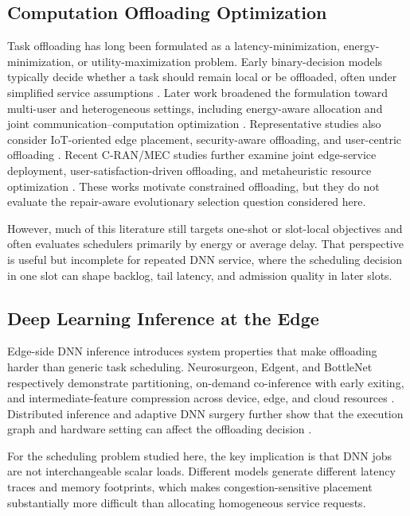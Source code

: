 \documentclass[pdflatex,sn-mathphys-num]{sn-jnl}
\begin{document}
\subsection{Computation Offloading Optimization}
Task offloading has long been formulated as a latency-minimization, energy-minimization, or utility-maximization problem. Early binary-decision models typically decide whether a task should remain local or be offloaded, often under simplified service assumptions \cite{Zhang2016}. Later work broadened the formulation toward multi-user and heterogeneous settings, including energy-aware allocation and joint communication--computation optimization \cite{Chen2018, You2017, Liu2016, Bi2018, Zhou2019, Deng2020}. Representative studies also consider IoT-oriented edge placement, security-aware offloading, and user-centric offloading \cite{Sun2016, Premsankar2018, Samy2022, Deng2021}. Recent C-RAN/MEC studies further examine joint edge-service deployment, user-satisfaction-driven offloading, and metaheuristic resource optimization \cite{pan2024joint,yang2024satisfaction,wang2025firefly}. These works motivate constrained offloading, but they do not evaluate the repair-aware evolutionary selection question considered here.

However, much of this literature still targets one-shot or slot-local objectives and often evaluates schedulers primarily by energy or average delay. That perspective is useful but incomplete for repeated DNN service, where the scheduling decision in one slot can shape backlog, tail latency, and admission quality in later slots.

\subsection{Deep Learning Inference at the Edge}
Edge-side DNN inference introduces system properties that make offloading harder than generic task scheduling. Neurosurgeon, Edgent, and BottleNet respectively demonstrate partitioning, on-demand co-inference with early exiting, and intermediate-feature compression across device, edge, and cloud resources \cite{Kang2017, Li2018, Eshratifar2019}. Distributed inference and adaptive DNN surgery further show that the execution graph and hardware setting can affect the offloading decision \cite{Teerapittayanon2017, Hu2019DNNsurgery}.

For the scheduling problem studied here, the key implication is that DNN jobs are not interchangeable scalar loads. Different models generate different latency traces and memory footprints, which makes congestion-sensitive placement substantially more difficult than allocating homogeneous service requests.
\end{document}
